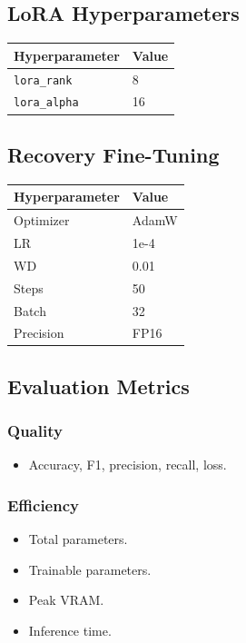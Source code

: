 \subsection{LoRA Hyperparameters}

\begin{table}[H]
\centering
\small
\begin{tabular}{ll}
\toprule
\textbf{Hyperparameter} & \textbf{Value} \\
\midrule
\texttt{lora\_rank} & 8 \\
\texttt{lora\_alpha} & 16 \\
\bottomrule
\end{tabular}
\end{table}

\subsection{Recovery Fine-Tuning}

\begin{table}[H]
\centering
\small
\begin{tabular}{ll}
\toprule
\textbf{Hyperparameter} & \textbf{Value} \\
\midrule
Optimizer & AdamW \\
LR & 1e-4 \\
WD & 0.01 \\
Steps & 50 \\
Batch & 32 \\
Precision & FP16 \\
\bottomrule
\end{tabular}
\end{table}

\subsection{Evaluation Metrics}

\subsubsection{Quality}
\begin{itemize}
\item Accuracy, F1, precision, recall, loss.

\end{itemize}
\subsubsection{Efficiency}
\begin{itemize}
\item Total parameters.
\item Trainable parameters.
\item Peak VRAM.
\item Inference time.

\end{itemize}
